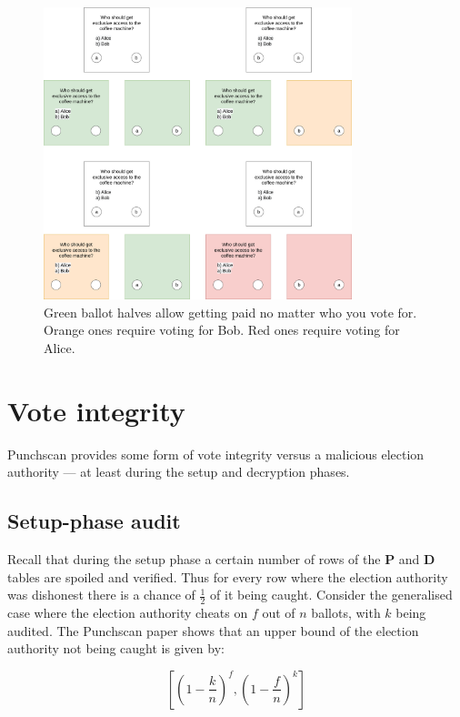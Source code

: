 \begin{figure}
\centering
\includegraphics[width=0.8\textwidth]{../resources/vote_buying_split_highlighted_no_selection.drawio.png}
\caption{Green ballot halves allow getting paid no matter who you vote for. Orange ones require voting for Bob. Red ones require voting for Alice.}
\label{fig:vote_buying}
\end{figure}

\section{Vote integrity}

Punchscan provides some form of vote integrity versus a malicious election
authority --- at least during the setup and decryption phases.

\subsection{Setup-phase audit}

Recall that during the setup phase a certain number of rows of the \textbf{P}
and \textbf{D} tables are spoiled and verified. Thus for every row where the
election authority was dishonest there is a chance of $\frac{1}{2}$ of it being
caught. Consider the generalised case where the election authority cheats on
$f$ out of $n$ ballots, with $k$ being audited. The Punchscan paper
shows\autocite[section 7.3]{fisherPunchscanIntroductionSystem2006} that an upper
bound of the election authority not being caught is given by:

\[
	\left[\left(1 - \frac{k}{n}\right)^f, \left(1 - \frac{f}{n}\right)^k\right]
\]


